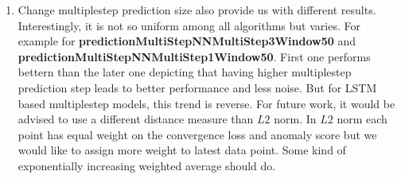 \documentclass[12pt]{article}
\begin{document}
\begin{enumerate}
\item Change multiplestep prediction size also provide us with different results. Interestingly, it is not so uniform among all algorithms but varies. For example for \textbf{predictionMultiStepNNMultiStep3Window50} and \textbf{predictionMultiStepNNMultiStep1Window50}. First one performs bettern than the later one depicting that having higher multiplestep prediction step leads to better performance and less noise. But for LSTM based multiplestep models, this trend is reverse. For future work, it would be advised to use a different distance measure than $L2$ norm. In $L2$ norm each point has equal weight on the convergence loss and anomaly score but we would like to assign more weight to latest data point. Some kind of exponentially increasing weighted average should do.
\end{enumerate}
\newpage
\end{document}
